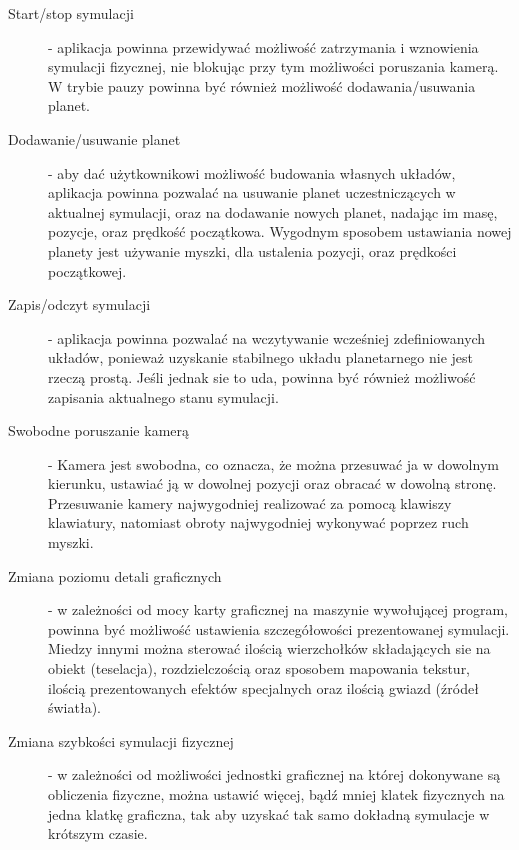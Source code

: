 \begin{description}
	\item[Start/stop symulacji] - aplikacja powinna przewidywać możliwość zatrzymania i wznowienia symulacji fizycznej, nie blokując przy tym możliwości poruszania kamerą. W trybie pauzy powinna być również możliwość dodawania/usuwania planet.
	\item[Dodawanie/usuwanie planet] - aby dać użytkownikowi możliwość budowania własnych układów, aplikacja powinna pozwalać na usuwanie planet uczestniczących w aktualnej symulacji, oraz na dodawanie nowych planet, nadając im masę, pozycje, oraz prędkość początkowa. Wygodnym sposobem ustawiania nowej planety jest używanie myszki, dla ustalenia pozycji, oraz prędkości początkowej.
	\item[Zapis/odczyt symulacji] - aplikacja powinna pozwalać na wczytywanie wcześniej zdefiniowanych układów, ponieważ uzyskanie stabilnego układu planetarnego nie jest rzeczą prostą. Jeśli jednak sie to uda, powinna być również możliwość zapisania aktualnego stanu symulacji.
	\item[Swobodne poruszanie kamerą] - Kamera jest swobodna, co oznacza, że można przesuwać ja w dowolnym kierunku, ustawiać ją w dowolnej pozycji oraz obracać w dowolną stronę. Przesuwanie kamery najwygodniej realizować za pomocą klawiszy klawiatury, natomiast obroty najwygodniej wykonywać poprzez ruch myszki.
	\item[Zmiana poziomu detali graficznych] - w zależności od mocy karty graficznej na maszynie wywołującej program, powinna być możliwość ustawienia szczegółowości prezentowanej symulacji. Miedzy innymi można sterować ilością wierzchołków składających sie na obiekt (teselacja), rozdzielczością oraz sposobem mapowania tekstur, ilością prezentowanych efektów specjalnych oraz ilością gwiazd (źródeł światła).
	\item[Zmiana szybkości symulacji fizycznej] - w zależności od możliwości jednostki graficznej na której dokonywane są obliczenia fizyczne, można ustawić więcej, bądź mniej klatek fizycznych na jedna klatkę graficzna, tak aby uzyskać tak samo dokładną symulacje w krótszym czasie.
\end{description}


